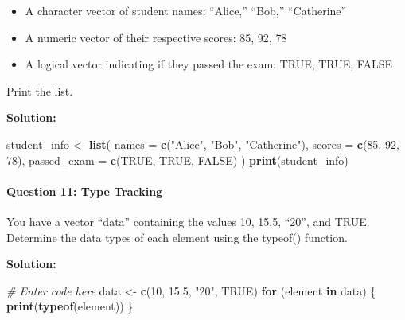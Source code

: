 \documentclass[
]{article}
\newenvironment{Shaded}{\begin{snugshade}}{\end{snugshade}}
\newcommand{\AttributeTok}[1]{\textcolor[rgb]{0.13,0.29,0.53}{#1}}
\newcommand{\CommentTok}[1]{\textcolor[rgb]{0.56,0.35,0.01}{\textit{#1}}}
\newcommand{\ConstantTok}[1]{\textcolor[rgb]{0.56,0.35,0.01}{#1}}
\newcommand{\ControlFlowTok}[1]{\textcolor[rgb]{0.13,0.29,0.53}{\textbf{#1}}}
\newcommand{\DecValTok}[1]{\textcolor[rgb]{0.00,0.00,0.81}{#1}}
\newcommand{\FloatTok}[1]{\textcolor[rgb]{0.00,0.00,0.81}{#1}}
\newcommand{\FunctionTok}[1]{\textcolor[rgb]{0.13,0.29,0.53}{\textbf{#1}}}
\newcommand{\NormalTok}[1]{#1}
\newcommand{\OtherTok}[1]{\textcolor[rgb]{0.56,0.35,0.01}{#1}}
\newcommand{\StringTok}[1]{\textcolor[rgb]{0.31,0.60,0.02}{#1}}
\begin{document}
\begin{itemize}
\item
  A character vector of student names: ``Alice,'' ``Bob,'' ``Catherine''
\item
  A numeric vector of their respective scores: 85, 92, 78
\item
  A logical vector indicating if they passed the exam: TRUE, TRUE, FALSE
\end{itemize}

Print the list.

\textbf{Solution:}

\begin{Shaded}
\begin{Highlighting}[]
\NormalTok{student\_info }\OtherTok{\textless{}{-}} \FunctionTok{list}\NormalTok{(}
  \AttributeTok{names =} \FunctionTok{c}\NormalTok{(}\StringTok{"Alice"}\NormalTok{, }\StringTok{"Bob"}\NormalTok{, }\StringTok{"Catherine"}\NormalTok{),}
  \AttributeTok{scores =} \FunctionTok{c}\NormalTok{(}\DecValTok{85}\NormalTok{, }\DecValTok{92}\NormalTok{, }\DecValTok{78}\NormalTok{),}
  \AttributeTok{passed\_exam =} \FunctionTok{c}\NormalTok{(}\ConstantTok{TRUE}\NormalTok{, }\ConstantTok{TRUE}\NormalTok{, }\ConstantTok{FALSE}\NormalTok{)}
\NormalTok{)}
\FunctionTok{print}\NormalTok{(student\_info)}
\end{Highlighting}
\end{Shaded}

\hypertarget{question-11-type-tracking}{%
\paragraph{Question 11: Type Tracking}\label{question-11-type-tracking}}

You have a vector ``data'' containing the values 10, 15.5, ``20'', and
TRUE. Determine the data types of each element using the typeof()
function.

\textbf{Solution:}

\begin{Shaded}
\begin{Highlighting}[]
\CommentTok{\# Enter code here}
\NormalTok{data }\OtherTok{\textless{}{-}} \FunctionTok{c}\NormalTok{(}\DecValTok{10}\NormalTok{, }\FloatTok{15.5}\NormalTok{, }\StringTok{"20"}\NormalTok{, }\ConstantTok{TRUE}\NormalTok{)}
\ControlFlowTok{for}\NormalTok{ (element }\ControlFlowTok{in}\NormalTok{ data) \{}
  \FunctionTok{print}\NormalTok{(}\FunctionTok{typeof}\NormalTok{(element))}
\NormalTok{\}}
\end{Highlighting}
\end{Shaded}
\end{document}
